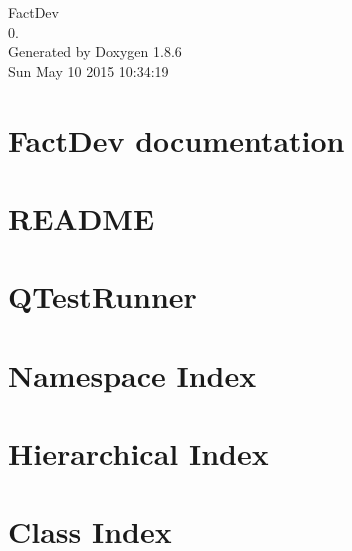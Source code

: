 \documentclass[twoside]{book}
\newcommand{\clearemptydoublepage}{%
  \newpage{\pagestyle{empty}\cleardoublepage}%
}
\begin{document}
\hypersetup{pageanchor=false}
\begin{titlepage}
\vspace*{7cm}
\begin{center}%
{\Large Fact\-Dev \\[1ex]\large 0. }\\
\vspace*{1cm}
{\large Generated by Doxygen 1.8.6}\\
\vspace*{0.5cm}
{\small Sun May 10 2015 10:34:19}\\
\end{center}
\end{titlepage}
\clearemptydoublepage
\tableofcontents
\clearemptydoublepage
{}
\hypersetup{pageanchor=true}

\chapter{Fact\-Dev documentation}
\label{index}\hypertarget{index}{}
\chapter{R\-E\-A\-D\-M\-E}
\label{da/d07/md__home_travis_build_FACT-Team_FactDev_src_libs_qt-mustache_README}
\hypertarget{da/d07/md__home_travis_build_FACT-Team_FactDev_src_libs_qt-mustache_README}{}

\chapter{Q\-Test\-Runner}
\label{d7/d95/md__home_travis_build_FACT-Team_FactDev_tests_QTestRunner_README}
\hypertarget{d7/d95/md__home_travis_build_FACT-Team_FactDev_tests_QTestRunner_README}{}

\chapter{Namespace Index}

\chapter{Hierarchical Index}

\chapter{Class Index}

\end{document}

